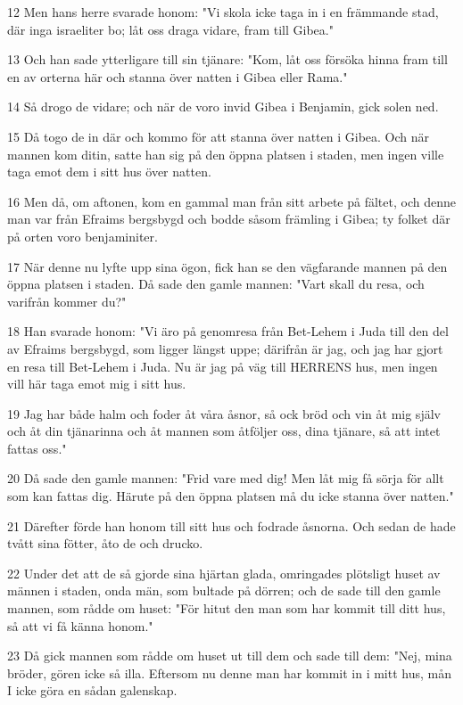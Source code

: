 \par 12 Men hans herre svarade honom: "Vi skola icke taga in i en främmande stad, där inga israeliter bo; låt oss draga vidare, fram till Gibea."
\par 13 Och han sade ytterligare till sin tjänare: "Kom, låt oss försöka hinna fram till en av orterna här och stanna över natten i Gibea eller Rama."
\par 14 Så drogo de vidare; och när de voro invid Gibea i Benjamin, gick solen ned.
\par 15 Då togo de in där och kommo för att stanna över natten i Gibea. Och när mannen kom ditin, satte han sig på den öppna platsen i staden, men ingen ville taga emot dem i sitt hus över natten.
\par 16 Men då, om aftonen, kom en gammal man från sitt arbete på fältet, och denne man var från Efraims bergsbygd och bodde såsom främling i Gibea; ty folket där på orten voro benjaminiter.
\par 17 När denne nu lyfte upp sina ögon, fick han se den vägfarande mannen på den öppna platsen i staden. Då sade den gamle mannen: "Vart skall du resa, och varifrån kommer du?"
\par 18 Han svarade honom: "Vi äro på genomresa från Bet-Lehem i Juda till den del av Efraims bergsbygd, som ligger längst uppe; därifrån är jag, och jag har gjort en resa till Bet-Lehem i Juda. Nu är jag på väg till HERRENS hus, men ingen vill här taga emot mig i sitt hus.
\par 19 Jag har både halm och foder åt våra åsnor, så ock bröd och vin åt mig själv och åt din tjänarinna och åt mannen som åtföljer oss, dina tjänare, så att intet fattas oss."
\par 20 Då sade den gamle mannen: "Frid vare med dig! Men låt mig få sörja för allt som kan fattas dig. Härute på den öppna platsen må du icke stanna över natten."
\par 21 Därefter förde han honom till sitt hus och fodrade åsnorna. Och sedan de hade tvått sina fötter, åto de och drucko.
\par 22 Under det att de så gjorde sina hjärtan glada, omringades plötsligt huset av männen i staden, onda män, som bultade på dörren; och de sade till den gamle mannen, som rådde om huset: "För hitut den man som har kommit till ditt hus, så att vi få känna honom."
\par 23 Då gick mannen som rådde om huset ut till dem och sade till dem: "Nej, mina bröder, gören icke så illa. Eftersom nu denne man har kommit in i mitt hus, mån I icke göra en sådan galenskap.
